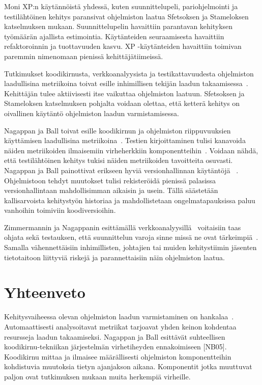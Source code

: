 \documentclass[finnish]{../tktltiki2}
\theoremstyle{definition}
\theoremstyle{remark}
\begin{document}
    Moni XP:n käytännöistä yhdessä, kuten suunnittelupeli, pariohjelmointi ja testilähtöinen kehitys paransivat 
ohjelmiston laatua Sfetsoksen ja Stameloksen katselmuksen mukaan. Suunnittelupelin havaittiin parantavan kehityksen 
työmäärän ajallista estimointia. Käytänteiden seuraamisesta havaittiin refaktoroinnin ja tuottavuuden kasvu. XP 
-käytänteiden havaittiin toimivan paremmin nimenomaan pienissä kehittäjätiimeissä.

    Tutkimukset koodikirnusta, verkkoanalyysista ja testikattavuudesta ohjelmiston laadullisina metriikoina toivat 
esille inhimillisen tekijän laadun takaamisessa~\cite{NB05, ZN08, MNDT09}. Kehittäjän tulee aktiivisesti itse vaikuttaa 
ohjelmiston laatuun. Sfetsoksen ja Stameloksen katselmuksen pohjalta voidaan olettaa, että ketterä kehitys on oivallinen 
käytäntö ohjelmiston laadun varmistamisessa.

    Nagappan ja Ball toivat esille koodikirnun ja ohjelmiston riippuvuuksien käyttämisen laadullisina 
metriikoina~\cite{NB05, NB07}. Testien kirjoittaminen tulisi kanavoida näiden metriikoiden ilmaisemiin virheherkkiin 
komponentteihin~\cite{MNDT09}. Voidaan nähdä, että testilähtöinen kehitys tukisi näiden metriikoiden tavoitteita 
osuvasti. Nagappan ja Ball painottivat erikseen hyviä versionhallinnan käytäntöjä ~\cite{NB05}. Ohjelmistoon tehdyt 
muutokset tulisi rekisteröidä pienissä palasissa versionhallintaan mahdollisimman aikaisin ja usein. Tällä säästetään 
kallisarvoista kehitystyön historiaa ja mahdollistetaan ongelmatapauksissa paluu vanhoihin toimiviin koodiversioihin.

    Zimmermannin ja Nagappanin esittämällä verkkoanalyysillä~\cite{ZN08} voitaisiin taas ohjata sekä testauksen, että 
suunnittelun varoja sinne missä ne ovat tärkeimpiä~\cite{NB07, MNDT09}. Samalla vähennettäisiin inhimillisten, johtajien 
tai muiden kehitystiimin jäsenten tietotaitoon liittyviä riskejä ja parannettaisiin näin ohjelmiston laatua.

\section{Yhteenveto}

Kehitysvaiheessa olevan ohjelmiston laadun varmistaminen on hankalaa~\cite{NB05, NB07, ZN08, MNDT09}. Automaattisesti 
analysoitavat metriikat tarjoavat yhden keinon kohdentaa resursseja laadun takaamiseksi. Nagappan ja Ball esittävät 
suhteellisen koodikirnu-tekniikan järjestelmän virhetiheyden ennakoimiseen [NB05]. Koodikirnu mittaa ja ilmaisee 
määrällisesti ohjelmiston komponentteihin kohdistuvia muutoksia tietyn ajanjakson aikana. Komponentit jotka muuttuvat 
paljon ovat tutkimuksen mukaan muita herkempiä virheille.
\end{document}
